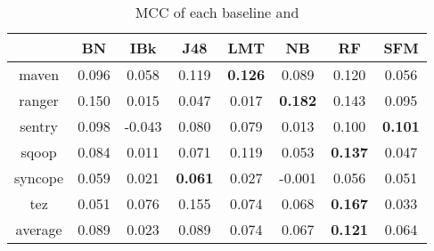\begin{table}[!ht]
\caption{MCC of each baseline and \simfinmo}
\centering
\begin{tabular}{|c|c|c|c|c|c|c|c|}
\hline
& BN & IBk & J48 & LMT & NB & RF & SFM \\ \hline
maven & 0.096 & 0.058 & 0.119 & \textbf{0.126} & 0.089 & 0.120 & 0.056 \\ \hline
ranger & 0.150 & 0.015 & 0.047 & 0.017 & \textbf{0.182} & 0.143 & 0.095 \\ \hline
sentry & 0.098 & -0.043 & 0.080 & 0.079 & 0.013 & 0.100 & \textbf{0.101} \\ \hline
sqoop & 0.084 & 0.011 & 0.071 & 0.119 & 0.053 & \textbf{0.137} & 0.047 \\ \hline
syncope & 0.059 & 0.021 & \textbf{0.061} & 0.027 & -0.001 & 0.056 & 0.051 \\ \hline
tez & 0.051 & 0.076 & 0.155 & 0.074 & 0.068 & \textbf{0.167} & 0.033 \\ \hline
average & 0.089 & 0.023 & 0.089 & 0.074 & 0.067 & \textbf{0.121} & 0.064 \\ \hline
\end{tabular}%
\label{tab:mcc}
\end{table}


